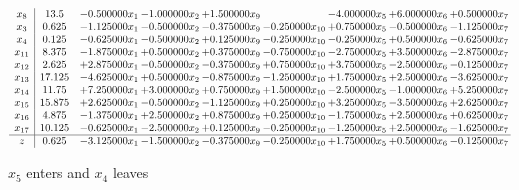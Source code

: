 \documentclass[10pt]{article}
\begin{document}
 \[\begin{array}{c| c c@{\hskip 2pt} c@{\hskip 2pt} c@{\hskip 2pt} c@{\hskip 2pt} c@{\hskip 2pt} c@{\hskip 2pt} c@{\hskip 2pt} }
 x_{8}   &  13.5 & -0.500000 x_{1} & -1.000000 x_{2} & + 1.500000 x_{9} &   & -4.000000 x_{5} & + 6.000000 x_{6} & + 0.500000 x_{7}\\
 x_{3}   &  0.625 & -1.125000 x_{1} & -0.500000 x_{2} & -0.375000 x_{9} & -0.250000 x_{10} & + 0.750000 x_{5} & -0.500000 x_{6} & -1.125000 x_{7}\\
 x_{4}   &  0.125 & -0.625000 x_{1} & -0.500000 x_{2} & + 0.125000 x_{9} & -0.250000 x_{10} & -0.250000 x_{5} & + 0.500000 x_{6} & -0.625000 x_{7}\\
 x_{11}   &  8.375 & -1.875000 x_{1} & + 0.500000 x_{2} & + 0.375000 x_{9} & -0.750000 x_{10} & -2.750000 x_{5} & + 3.500000 x_{6} & -2.875000 x_{7}\\
 x_{12}   &  2.625 & + 2.875000 x_{1} & -0.500000 x_{2} & -0.375000 x_{9} & + 0.750000 x_{10} & + 3.750000 x_{5} & -2.500000 x_{6} & -0.125000 x_{7}\\
 x_{13}   &  17.125 & -4.625000 x_{1} & + 0.500000 x_{2} & -0.875000 x_{9} & -1.250000 x_{10} & + 1.750000 x_{5} & + 2.500000 x_{6} & -3.625000 x_{7}\\
 x_{14}   &  11.75 & + 7.250000 x_{1} & + 3.000000 x_{2} & + 0.750000 x_{9} & + 1.500000 x_{10} & -2.500000 x_{5} & -1.000000 x_{6} & + 5.250000 x_{7}\\
 x_{15}   &  15.875 & + 2.625000 x_{1} & -0.500000 x_{2} & -1.125000 x_{9} & + 0.250000 x_{10} & + 3.250000 x_{5} & -3.500000 x_{6} & + 2.625000 x_{7}\\
 x_{16}   &  4.875 & -1.375000 x_{1} & + 2.500000 x_{2} & + 0.875000 x_{9} & + 0.250000 x_{10} & -1.750000 x_{5} & + 2.500000 x_{6} & + 0.625000 x_{7}\\
 x_{17}   &  10.125 & -0.625000 x_{1} & -2.500000 x_{2} & + 0.125000 x_{9} & -0.250000 x_{10} & -1.250000 x_{5} & + 2.500000 x_{6} & -1.625000 x_{7}\\
\hline
z    &  0.625 & -3.125000 x_{1} & -1.500000 x_{2} & -0.375000 x_{9} & -0.250000 x_{10} & + 1.750000 x_{5} & + 0.500000 x_{6} & -0.125000 x_{7}\\
\end{array}\]


 $ x_{5} $ enters and $ x_{4} $ leaves 
\end{document}
